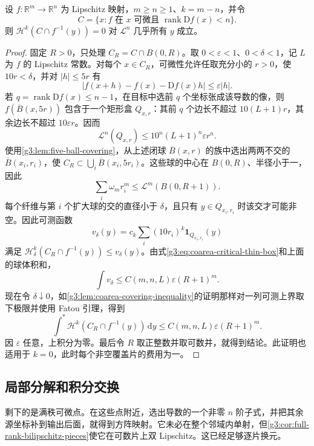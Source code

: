 \begin{lemma}\label{g3:lem:coarea-critical-slices}
	设 \(f:\mathbb R^m\to\mathbb R^n\) 为 Lipschitz 映射，\(m\ge n\ge1\)、\(k=m-n\)，并令
	\[
		C=\{x:f\text{ 在 }x\text{ 可微且 }\operatorname{rank}\mathrm Df(x)<n\}.
	\]
	则 \(\mathcal H^k(C\cap f^{-1}(y))=0\) 对 \(\mathcal L^n\) 几乎所有 \(y\) 成立。
\end{lemma}
\begin{proof}
	固定 \(R>0\)，只处理 \(C_R=C\cap B(0,R)\)。取 \(0<\varepsilon<1\)、\(0<\delta<1\)，记 \(L\) 为 \(f\) 的 Lipschitz 常数。对每个 \(x\in C_R\)，可微性允许任取充分小的 \(r>0\)，使 \(10r<\delta\)，并对 \(|h|\le5r\) 有
	\[
		|f(x+h)-f(x)-\mathrm Df(x)h|\le\varepsilon|h|.
	\]
	若 \(q=\operatorname{rank}\mathrm Df(x)\le n-1\)，在目标中选前 \(q\) 个坐标张成该导数的像，则 \(f(\overline B(x,5r))\) 包含于一个矩形盒 \(Q_{x,r}\)：其前 \(q\) 个边长不超过 \(10(L+1)r\)，其余边长不超过 \(10\varepsilon r\)。因而
	\begin{equation}\label{g3:eq:coarea-critical-thin-box}
		\mathcal L^n(Q_{x,r})
		\le10^n(L+1)^n\varepsilon r^n.
	\end{equation}
	使用\cref{g3:lem:five-ball-covering}，从上述闭球 \(\overline B(x,r)\) 的族中选出两两不交的 \(\overline B(x_i,r_i)\)，使 \(C_R\subset\bigcup_i\overline B(x_i,5r_i)\)。这些球的中心在 \(B(0,R)\)、半径小于一，因此
	\[
		\sum_i\omega_mr_i^m\le\mathcal L^m(B(0,R+1)).
	\]
	每个纤维与第 \(i\) 个扩大球的交的直径小于 \(\delta\)，且只有 \(y\in Q_{x_i,r_i}\) 时该交才可能非空。因此可测函数
	\[
		v_\delta(y)=c_k\sum_i(10r_i)^k\mathbf1_{Q_{x_i,r_i}}(y)
	\]
	满足 \(\mathcal H^k_\delta(C_R\cap f^{-1}(y))\le v_\delta(y)\)。由式\eqref{g3:eq:coarea-critical-thin-box}和上面的球体积和，
	\[
		\int v_\delta\le C(m,n,L)\varepsilon(R+1)^m.
	\]
	现在令 \(\delta\downarrow0\)，如\cref{g3:lem:coarea-covering-inequality}的证明那样对一列可测上界取下极限并使用 Fatou 引理，得到
	\[
		\int^*\mathcal H^k(C_R\cap f^{-1}(y))\,\mathrm dy
		\le C(m,n,L)\varepsilon(R+1)^m.
	\]
	因 \(\varepsilon\) 任意，上积分为零。最后令 \(R\) 取正整数并取可数并，就得到结论。此证明也适用于 \(k=0\)，此时每个非空覆盖片的费用为一。
\end{proof}

\subsection{局部分解和积分交换}
\label{g3:subsec:2004:03}
剩下的是满秩可微点。在这些点附近，选出导数的一个非零 \(n\) 阶子式，并把其余源坐标补到输出后面，就得到方阵映射。它未必在整个邻域内单射，但\cref{g3:cor:full-rank-bilipschitz-pieces}使它在可数片上双 Lipschitz。这已经足够逐片换元。

